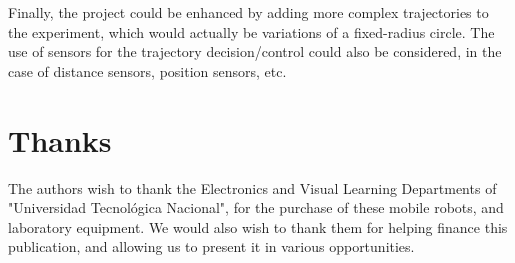 \documentclass[a4paper]{aadeca}
\begin{document}
Finally, the project could be enhanced by adding more complex trajectories to the experiment, which would actually be variations of a fixed-radius circle.
The use of sensors for the trajectory decision/control could also be considered, in the case of distance sensors, position sensors, etc.
 
\section{Thanks}

The authors wish to thank the Electronics and Visual Learning Departments of "Universidad Tecnológica Nacional", for the purchase of these mobile robots, and laboratory equipment.
We would also wish to thank them for helping finance this publication, and allowing us to present it in various opportunities.

 

\end{document}
